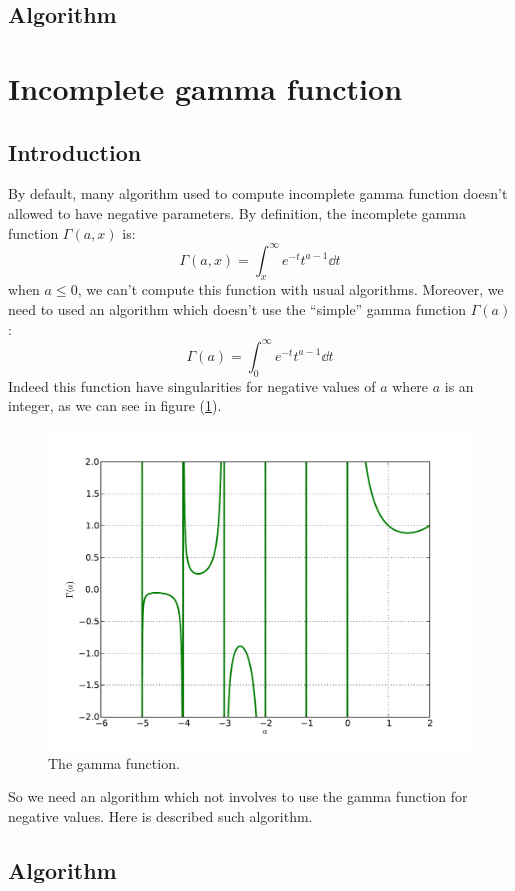 \subsection{Algorithm}
%
\section{Incomplete gamma function}
\label{sec:gamma}
%
\subsection{Introduction}
%
By default, many algorithm used to compute incomplete gamma function doesn't
allowed to have negative parameters. By definition, the incomplete gamma
function $\Gamma\left({a,x}\right)$ is:
%
\begin{equation}
    \Gamma\left({a,x}\right)=\int_x^\infty{e^{-t}{t^{a-1}}\dd{t}}
\end{equation}
%
when $a\leq0$, we can't compute this function with usual algorithms. Moreover,
we need to used an algorithm which doesn't use the ``simple'' gamma function
$\Gamma\left({a}\right)$:
%
\begin{equation}
    \Gamma\left({a}\right)=\int_0^\infty{e^{-t}{t^{a-1}}\dd{t}}
\end{equation}
%
Indeed this function have singularities for negative values of $a$ where $a$ is
an integer, as we can see in figure (\ref{fig:gamma}).
%
\begin{figure}[hbtp]
    \centering
    \includegraphics[width=0.5\linewidth]{figures/gamma/gamma}
    \caption{The gamma function.\label{fig:gamma}}
\end{figure}
%
So we need an algorithm which not involves to use the gamma function for
negative values. Here is described such algorithm.
%
\subsection{Algorithm}
%
